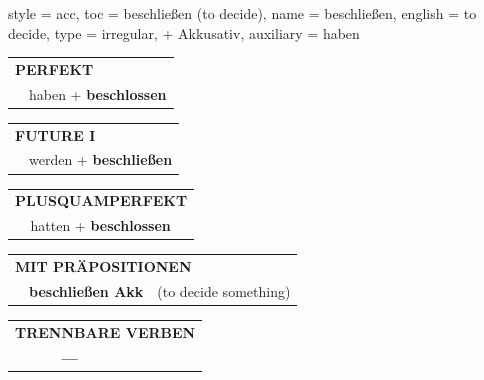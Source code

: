 \begin{verbentry}{
  style = {acc},
  toc = {beschließen (to decide)},
  name = {beschließen},
  english = {to decide},
  type = {irregular, + Akkusativ},
  auxiliary = {haben}
}
\vspace{10pt}

\begin{tabular}{rl}
\multicolumn{2}{l}{\textbf{PERFEKT}}\\
& haben + \textbf{beschlossen}\\
\end{tabular}
\hfill
\begin{tabular}{rl}
\multicolumn{2}{l}{\textbf{FUTURE I}}\\
& werden + \textbf{beschließen}\\
\end{tabular}
\hfill
\begin{tabular}{rl}
\multicolumn{2}{l}{\textbf{PLUSQUAMPERFEKT}}\\
& hatten + \textbf{beschlossen}\\
\end{tabular}

\vspace{10pt}

\begin{tabular}{lll}
\multicolumn{3}{l}{\textbf{MIT PRÄPOSITIONEN}}\\
& \textbf{beschließen Akk} & (to decide something)\\
\end{tabular}
\hfill
\begin{tabular}{lll}
\multicolumn{3}{l}{\textbf{TRENNBARE VERBEN}}\\
& \textbf{---} & \\
\end{tabular}

\vspace{-5pt}
\end{verbentry}

